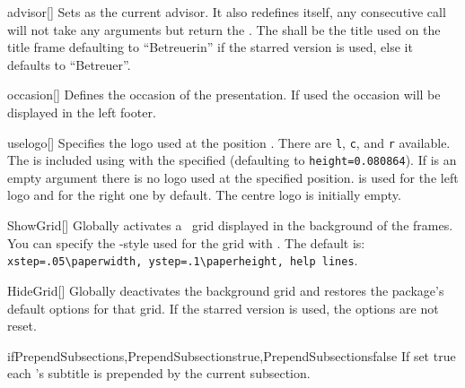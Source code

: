 \begin{describemacro}{advisor}[\meta{*}]
  Sets  as the current advisor. It also redefines itself, any
  consecutive call will not take any arguments but return the . The
   shall be the title used on the title frame defaulting to
  \enquote{Betreuerin} if the starred version is used, else it defaults to
  \enquote{Betreuer}.
\end{describemacro}

\begin{describemacro}{occasion}[]
  Defines the occasion of the presentation. If used the occasion will be
  displayed in the left footer.
\end{describemacro}

\begin{describemacro}{uselogo}[]
  Specifies the logo used at the position . There are \texttt{l},
  \texttt{c}, and \texttt{r} available. The  is included using
   with the specified  (defaulting to
  \texttt{height=0.080864}). If  is an empty argument
  there is no logo used at the specified position.
   is used for the left logo and
   for the right one by default. The centre
  logo is initially empty.
\end{describemacro}

\begin{describemacro}{ShowGrid}[]
  Globally activates a \TikZ\ grid displayed in the background of the frames.
  You can specify the \TikZ-style used for the grid with . The
  default is: \verb|xstep=.05\paperwidth, ystep=.1\paperheight, help lines|.
\end{describemacro}

\begin{describemacro}{HideGrid}[\meta{*}]
  Globally deactivates the background grid and restores the package's default
  options for that grid. If the starred version is used, the options are not
  reset.
\end{describemacro}

\begin{describemacro}
  {ifPrependSubsections,PrependSubsectionstrue,PrependSubsectionsfalse}
  If set true each 's subtitle is prepended by the current
  subsection.
\end{describemacro}

